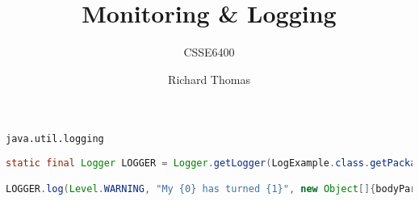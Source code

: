 \documentclass{slide}
\title{Monitoring \& Logging}
\subtitle{CSSE6400}
\author{Richard Thomas}
\date{\week{9}}
\begin{document}
\maketitle


\begin{frame}{\texttt{java.util.logging}}
\begin{lstlisting}[language=java]
static final Logger LOGGER = Logger.getLogger(LogExample.class.getPackage().getName());

LOGGER.log(Level.WARNING, "My {0} has turned {1}", new Object[]{bodyPart, colour});
\end{lstlisting}
\end{frame}

\end{document}
